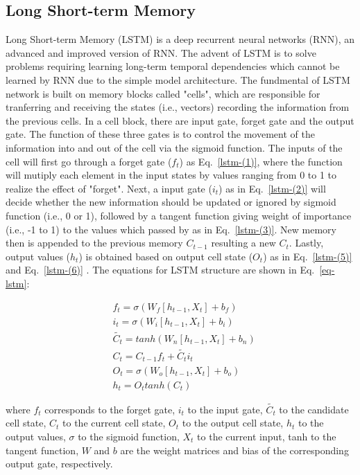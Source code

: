 \subsection{Long Short-term Memory}
Long Short-term Memory (LSTM) is a deep recurrent neural networks (RNN), an advanced and improved version of RNN. The advent of LSTM is to solve problems requiring learning long-term temporal dependencies which cannot be learned by RNN due to the simple model architecture. The fundmental of LSTM network is built on memory blocks called "cells", which are responsible for tranferring and receiving the states (i.e., vectors) recording the information from the previous cells. In a cell block, there are input gate, forget gate and the output gate. The function of these three gates is to control the movement of the information into and out of the cell via the sigmoid function. The inputs of the cell will first go through a forget gate ($f_t$) as Eq.~\ref{lstm-(1)}, where the function will mutiply each element in the input states by values ranging from 0 to 1 to realize the effect of "forget". Next, a input gate ($i_t$) as in Eq.~\ref{lstm-(2)} will decide whether the new information should be updated or ignored by sigmoid function (i.e., 0 or 1), followed by a tangent function giving weight of importance (i.e., -1 to 1) to the values which passed by as in Eq.~\ref{lstm-(3)}. New memory then is appended to the previous memory $C_{t-1}$ resulting a new $C_t$. Lastly, output values ($h_t$) is obtained based on output cell state ($O_t$) as in Eq.~\ref{lstm-(5)} and Eq.~\ref{lstm-(6)} \citep{leApplicationLongShortTerm2019}. The equations for LSTM structure are shown in Eq.~\ref{eq-lstm}:

\begin{subequations} \label{eq-lstm}
  \begin{align}
      &f_t=\sigma(W_f[h_{t-1},X_t]+b_f) \label{lstm-(1)}\\
      &i_t=\sigma(W_i[h_{t-1},X_t]+b_i) \label{lstm-(2)}\\
      &\tilde{C_t}=tanh(W_n[h_{t-1},X_t]+b_n) \label{lstm-(3)}\\
      &C_t=C_{t-1}f_t+\tilde{C_t}i_t \label{lstm-(4)}\\
      &O_t=\sigma(W_o[h_{t-1},X_t]+b_o) \label{lstm-(5)}\\
      &h_t=O_ttanh(C_t) \label{lstm-(6)}
  \end{align}
\end{subequations}

\noindent
where $f_t$ corresponds to the forget gate, $i_t$ to the input gate, $\tilde{C_t}$ to the candidate cell state, $C_t$ to the current cell state, $O_t$ to the output cell state, $h_t$ to the output values, $\sigma$ to the sigmoid function, $X_t$ to the current input, tanh to the tangent function, $W$ and $b$ are the weight matrices and bias of the corresponding output gate, respectively.

